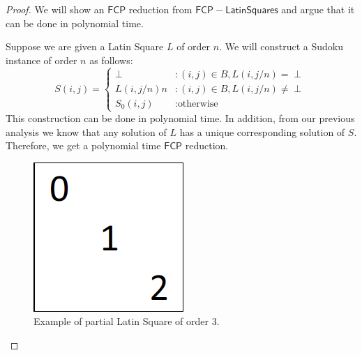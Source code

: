 \documentclass[runningheads,a4paper]{llncs}
\begin{document}
\begin{proof} 

We will show an $\mathsf{FCP}$ reduction from $\mathsf{FCP-Latin Squares}$ and argue that it can be done in polynomial time.

Suppose we are given a Latin Square $L$ of order $n$. We will construct a Sudoku instance of order $n$ as follows:
\begin{displaymath}
S(i,j) = \left\{
\begin{array}{lr}
\perp & : (i,j) \in B, L(i, j/n) = \perp \\
L(i, j/n) n & : (i,j) \in B, L(i, j/n) \neq \perp \\
S_0 (i,j) & : \text{otherwise}
\end{array}
\right.
\end{displaymath}
This construction can be done in polynomial time. In addition, from our previous analysis we know that any solution of $L$ has a unique corresponding solution of $S$. Therefore, we get a polynomial time $\mathsf{FCP}$ reduction.

\begin{figure}[H]
\label{fig:partialLS}
\centering
\includegraphics[scale=0.25]{sudoku-3.png}
\caption{Example of partial Latin Square of order 3.}
\end{figure}


\end{proof}
\end{document}
